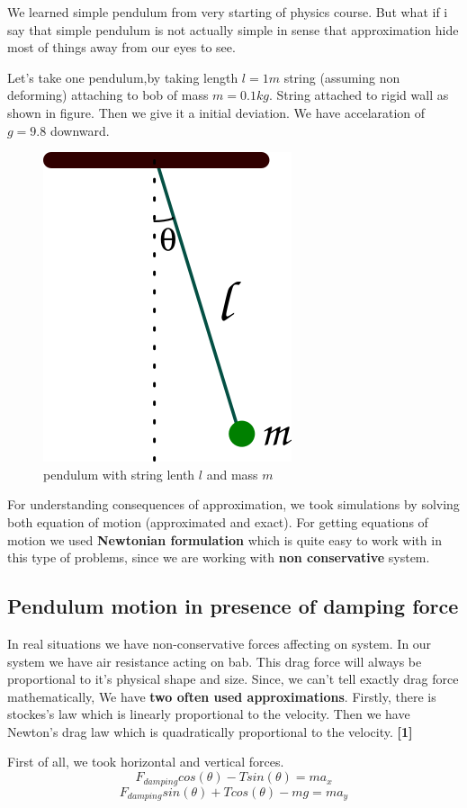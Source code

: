 \documentclass[11pt,a4paper]{article}
\begin{document}
We learned simple pendulum from very starting of physics course. But what if i say that simple pendulum is not actually simple in sense that approximation hide most of things away from our eyes to see.

Let's take one pendulum,by taking length \(l = 1 m\) string (assuming non deforming) attaching to bob of mass \(m = 0.1 kg\). String attached to rigid wall as shown in figure. Then we give it a initial deviation. We have accelaration of \(g=9.8\) downward.

\begin{figure}[htbp]
\centering
\includegraphics[width=0.3 \textwidth]{./figure1.png}
\caption{\label{fig:orgab0b11b}pendulum with string lenth \(l\) and mass \(m\)}
\end{figure}

For understanding consequences of approximation, we took simulations by solving both equation of motion (approximated and exact). For getting equations of motion we used \textbf{Newtonian formulation} which is quite easy to work with in this type of problems, since we are working with \textbf{non conservative} system.


\subsection{Pendulum motion in presence of damping force}
\label{sec:org9f9e7f6}

In real situations we have non-conservative forces affecting on system. In our system we have air resistance acting on bab. This drag force will always be proportional to it's physical shape and size. Since, we can't tell exactly drag force mathematically, We have \textbf{two often used approximations}. Firstly, there is stockes's law which is linearly proportional to the velocity. Then we have Newton's drag law which is quadratically proportional to the velocity. \textbf{\textbf{[1]}}   



First of all, we took horizontal and vertical forces.
\begin{equation}
\label{eq:orga01b24f}
   F_{damping}cos(\theta)-Tsin(\theta)=ma_{x}
\end{equation}
\begin{equation}
\label{eq:orged11d8f}
   F_{damping}sin(\theta)+Tcos(\theta)-mg=ma_{y}
\end{equation}
\end{document}
